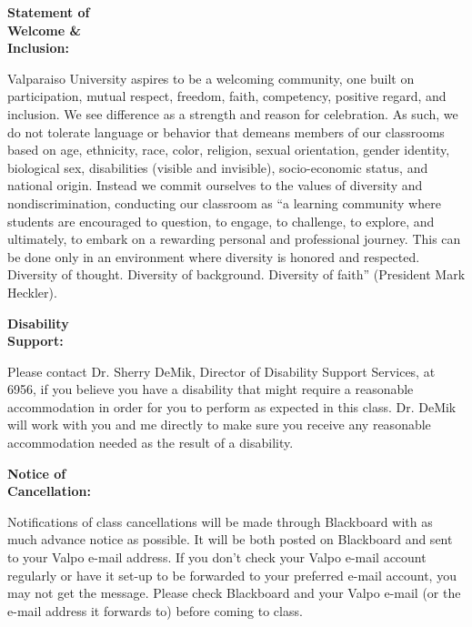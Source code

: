 \documentclass{article}
\theoremstyle{plain}
\theoremstyle{definition}
\theoremstyle{remark}
\begin{document}

\vskip0.1in\noindent
\begin{minipage}[t]{1.2in}
	\textbf{Statement of \\Welcome \& \\ Inclusion:}
\end{minipage}
\begin{minipage}[t]{5.3in}
Valparaiso University aspires to be a welcoming community, one built on participation, mutual respect, freedom, faith, competency, positive regard, and inclusion. We see difference as a strength and reason for celebration. As such, we do not tolerate language or behavior that demeans members of our classrooms based on age, ethnicity, race, color, religion, sexual orientation, gender identity, biological sex, disabilities (visible and invisible), socio-economic status, and national origin. Instead we commit ourselves to the values of diversity and nondiscrimination, conducting our classroom as ``a learning community where students are encouraged to question, to engage, to challenge, to explore, and ultimately, to embark on a rewarding personal and professional journey. This can be done only in an environment where diversity is honored and respected. Diversity of thought. Diversity of background. Diversity of faith'' (President Mark Heckler).
\end{minipage}

\vskip0.1in \noindent
\begin{minipage}[t]{1.2in}
	\textbf{Disability \\Support:}
\end{minipage}
\begin{minipage}[t]{5.3in}
Please contact Dr. Sherry DeMik, Director of Disability Support Services, at 6956, if you believe you have a disability that might require a reasonable accommodation in order for you to perform as expected in this class. Dr. DeMik will work with you and me directly to make sure you receive any reasonable accommodation needed as the result of a disability.
\end{minipage}

\vskip0.1in \noindent
\begin{minipage}[t]{1.2in}
	\textbf{Notice of \\Cancellation:}
\end{minipage}
\begin{minipage}[t]{5.3in}
Notifications of class cancellations will be made through Blackboard with as much advance notice as possible. It will be both posted on Blackboard and sent to your Valpo e-mail address. If you don’t check your Valpo e-mail account regularly or have it set-up to be forwarded to your preferred e-mail account, you may not get the message. Please check Blackboard and your Valpo e-mail (or the e-mail address it forwards to) before coming to class.
\end{minipage}
\end{document}
